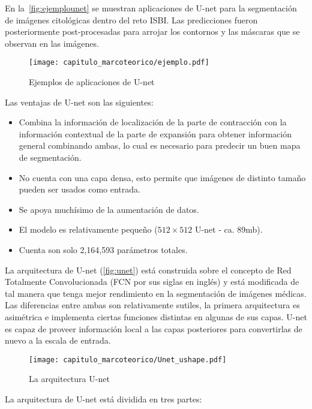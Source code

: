En la~\autoref{fig:ejemplounet} se muestran aplicaciones de U-net para la
segmentación de imágenes citológicas dentro del reto ISBI. Las predicciones
fueron posteriormente post-procesadas para arrojar los contornos y las máscaras
que se observan en las imágenes.

\begin{figure}[H]
    \centering
    \texttt{[image: capitulo\_marcoteorico/ejemplo.pdf]}
    \caption{Ejemplos de aplicaciones de U-net}\label{fig:ejemplounet}
\end{figure}

Las ventajas de U-net son las siguientes:

\begin{itemize}
    \item Combina la información de localización de la parte de contracción con la
    información contextual de la parte de expansión para obtener información
    general combinando ambas, lo cual es necesario para predecir un buen mapa
    de segmentación.
    \item No cuenta con una capa densa, esto permite que imágenes de distinto
    tamaño pueden ser usados como entrada.
    \item Se apoya muchísimo de la aumentación de datos.
    \item El modelo es relativamente pequeño (\(512\times512\) U-net - ca. 89mb).
    \item Cuenta son solo 2,164,593 parámetros totales.
\end{itemize}

La arquitectura de U-net (\autoref{fig:unet}) está construida sobre el concepto de 
Red Totalmente Convolucionada (FCN por sus siglas en inglés) y está modificada
de tal manera que tenga mejor rendimiento en la segmentación de imágenes médicas. 
Las diferencias entre ambas son relativamente sutiles, la primera arquitectura es
asimétrica e implementa ciertas funciones distintas en algunas de sus capas. U-net
es capaz de proveer información local a las capas posteriores para convertirlas
de nuevo a la escala de entrada.~\cite{DeepLearning}

\begin{figure}[H]
    \centering
    \texttt{[image: capitulo\_marcoteorico/Unet\_ushape.pdf]}
    \caption{La arquitectura U-net}\label{fig:unet}
\end{figure}

La arquitectura de U-net está dividida en tres partes:

